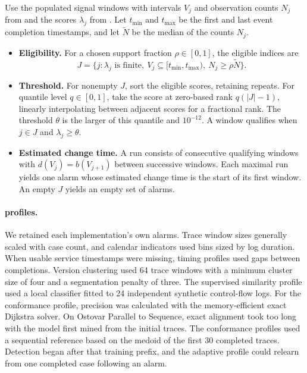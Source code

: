 \begin{Definition}\label{def:assessment-alarms}
Use the populated signal windows with intervals $V_j$ and observation counts $N_j$ from  and the scores $\lambda_j$ from . Let $t_{\min}$ and $t_{\max}$ be the first and last event completion timestamps, and let $\widetilde N$ be the median of the counts $N_j$.
\begin{itemize}
  \item \textbf{Eligibility.} For a chosen support fraction $\rho\in[0,1]$, the eligible indices are
  \[
    J=\{j:\lambda_j\text{ is finite},\ V_j\subseteq[t_{\min},t_{\max}),\
                   N_j\geq\rho\widetilde N\}.
  \]
  \item \textbf{Threshold.} For nonempty $J$, sort the eligible scores, retaining repeats. For quantile level $q\in[0,1]$, take the score at zero-based rank $q(|J|-1)$, linearly interpolating between adjacent scores for a fractional rank. The threshold $\theta$ is the larger of this quantile and $10^{-12}$. A window qualifies when $j\in J$ and $\lambda_j\geq\theta$.
  \item \textbf{Estimated change time.} A run consists of consecutive qualifying windows with $d(V_j)=b(V_{j+1})$ between successive windows. Each maximal run yields one alarm whose estimated change time is the start of its first window. An empty $J$ yields an empty set of alarms.
\end{itemize}
\end{Definition}

\paragraph{\softwarepm{} profiles.}
We retained each \softwarepm{} implementation's own alarms. Trace window sizes generally scaled with case count, and calendar indicators used bins sized by log duration. When usable service timestamps were missing, timing profiles used gaps between completions. Version clustering used 64 trace windows with a minimum cluster size of four and a segmentation penalty of three. The supervised similarity profile used a local classifier fitted to 24 independent synthetic control-flow logs. For the conformance profile, precision was calculated with the memory-efficient exact Dijkstra solver. On Ostovar Parallel to Sequence, exact alignment took too long with the model first mined from the initial traces. The conformance profiles used a sequential reference based on the medoid of the first 30 completed traces. Detection began after that training prefix, and the adaptive profile could relearn from one completed case following an alarm.

